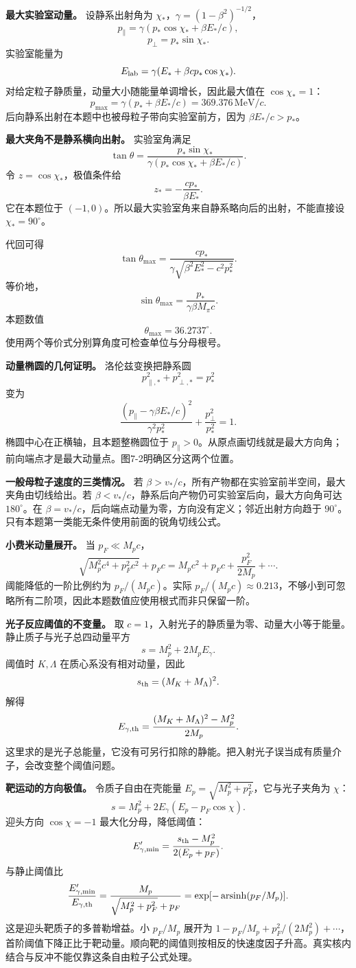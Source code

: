 \documentclass[12pt,a4paper,UTF8]{ctexart}
\begin{document}
\textbf{最大实验室动量。} 设静系出射角为
\(\chi_*\)，\(\gamma=(1-\beta^2)^{-1/2}\)， \[
p_\parallel=\gamma(p_*\cos\chi_*+\beta E_*/c),
\] \[
p_\perp=p_*\sin\chi_*.
\] 实验室能量为 \[
E_{\rm lab}=\gamma(E_*+\beta cp_*\cos\chi_*).
\] 对给定粒子静质量，动量大小随能量单调增长，因此最大值在
\(\cos\chi_*=1\)： \[
\boxed{p_{\max}=\gamma(p_*+\beta E_*/c)}
=\boxed{369.376\,\mathrm{MeV}/c}.
\] 后向静系出射在本题中也被母粒子带向实验室前方，因为
\(\beta E_*/c>p_*\)。

\textbf{最大夹角不是静系横向出射。} 实验室角满足 \[
\tan\theta=\frac{p_*\sin\chi_*}
{\gamma(p_*\cos\chi_*+\beta E_*/c)}.
\] 令 \(z=\cos\chi_*\)，极值条件给 \[
z_*=-\frac{cp_*}{\beta E_*}.
\] 它在本题位于
\((-1,0)\)。所以最大实验室角来自静系略向后的出射，不能直接设
\(\chi_*=90^\circ\)。

代回可得 \[
\boxed{\tan\theta_{\max}
=\frac{cp_*}{\gamma\sqrt{\beta^2E_*^2-c^2p_*^2}}}.
\] 等价地， \[
\boxed{\sin\theta_{\max}
=\frac{p_*}{\gamma\beta M_\pi c}}.
\] 本题数值 \[
\boxed{\theta_{\max}=36.2737^\circ}.
\] 使用两个等价式分别算角度可检查单位与分母根号。

\textbf{动量椭圆的几何证明。} 洛伦兹变换把静系圆 \[
p_{\parallel,*}^2+p_{\perp,*}^2=p_*^2
\] 变为 \[
\frac{(p_\parallel-\gamma\beta E_*/c)^2}{\gamma^2p_*^2}
+\frac{p_\perp^2}{p_*^2}=1.
\] 椭圆中心在正横轴，且本题整椭圆位于
\(p_\parallel>0\)。从原点画切线就是最大方向角；前向端点才是最大动量点。图7-2明确区分这两个位置。

\textbf{一般母粒子速度的三类情况。} 若
\(\beta>v_*/c\)，所有产物都在实验室前半空间，最大夹角由切线给出。若
\(\beta<v_*/c\)，静系后向产物仍可实验室后向，最大方向角可达
\(180^\circ\)。在
\(\beta=v_*/c\)，后向端点动量为零，方向没有定义；邻近出射方向趋于
\(90^\circ\)。只有本题第一类能无条件使用前面的锐角切线公式。

\textbf{小费米动量展开。} 当 \(p_F\ll M_pc\)， \[
\sqrt{M_p^2c^4+p_F^2c^2}+p_Fc
=M_pc^2+p_Fc+\frac{p_F^2}{2M_p}+\cdots.
\] 阈能降低的一阶比例约为 \(p_F/(M_pc)\)。实际
\(p_F/(M_pc)\approx0.213\)，不够小到可忽略所有二阶项，因此本题数值应使用根式而非只保留一阶。

\textbf{光子反应阈值的不变量。} 取
\(c=1\)，入射光子的静质量为零、动量大小等于能量。静止质子与光子总四动量平方
\[
s=M_p^2+2M_pE_\gamma.
\] 阈值时 \(K,\Lambda\) 在质心系没有相对动量，因此 \[
s_{\rm th}=(M_K+M_\Lambda)^2.
\] 解得 \[
E_{\gamma,\rm th}=\frac{(M_K+M_\Lambda)^2-M_p^2}{2M_p}.
\]
这里求的是光子总能量，它没有可另行扣除的静能。把入射光子误当成有质量介子，会改变整个阈值问题。

\textbf{靶运动的方向极值。} 令质子自由在壳能量
\(E_p=\sqrt{M_p^2+p_F^2}\)，它与光子夹角为 \(\chi\)： \[
s=M_p^2+2E_\gamma(E_p-p_F\cos\chi).
\] 迎头方向 \(\cos\chi=-1\) 最大化分母，降低阈值： \[
E'_{\gamma,\min}=\frac{s_{\rm th}-M_p^2}{2(E_p+p_F)}.
\] 与静止阈值比 \[
\frac{E'_{\gamma,\min}}{E_{\gamma,\rm th}}=
\frac{M_p}{\sqrt{M_p^2+p_F^2}+p_F}
=\exp[-\operatorname{arsinh}(p_F/M_p)].
\] 这是迎头靶质子的多普勒增益。小 \(p_F/M_p\) 展开为
\(1-p_F/M_p+p_F^2/(2M_p^2)+\cdots\)，首阶阈值下降正比于靶动量。顺向靶的阈值则按相反的快速度因子升高。真实核内结合与反冲不能仅靠这条自由粒子公式处理。
\end{document}
